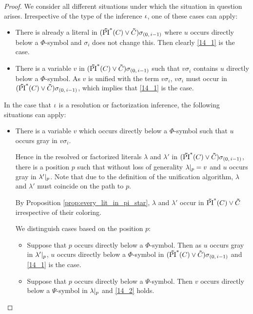 \documentclass[%
	draft=false,%
	numbers=noendperiod,%
	11pt,%
	a4paper,%
	oneside,%
	openany,%
]{memoir}
\begin{document}
\begin{proof}
	We consider all different situations under which the situation in question arises.
	Irrespective of the type of the inference $\iota$, one of these cases can apply:

	\begin{itemize}
		\item
			There is already a literal in $(\bm\tilde{\operatorname{PI}}^{*}(C)\lor \bm\tilde{C})\sigma_{(0,\,i-1)}$ where $u$ occurs directly below a $\Phi$-symbol and $\sigma_i$ does not change this.
			Then clearly \ref{14_1} is the case.

		\item
			There is a variable $v$ in $(\bm\tilde{\operatorname{PI}}^{*}(C)\lor \bm\tilde{C})\sigma_{(0,\,i-1)}$ such that $v\sigma_i$ contains $u$ directly below a $\Phi$-symbol.
			As $v$ is unified with the term $v\sigma_i$, $v\sigma_i$ must occur in $(\bm\tilde{\operatorname{PI}}^{*}(C)\lor \bm\tilde{C})\sigma_{(0,\,i-1)}$, which implies that \ref{14_1} is the case.

	\end{itemize}


	\noindent
	In the case that $\iota$ is a resolution or factorization inference, 
	the following situations can apply:

	\begin{itemize}
		\item
			There is a variable $v$ which occurs directly below a $\Phi$-symbol such that $u$ occurs gray in $v\sigma_i$.

			Hence in the resolved or factorized literals $\lambda$ and $\lambda'$ in $(\bm\tilde{\operatorname{PI}}^{*}(C)\lor \bm\tilde{C})\sigma_{(0,\,i-1)}$, there is a position $p$ such that without loss of generality $\lambda|_{p} = v$ and $u$ occurs gray in $\lambda'|_{p}$. 
			Note that due to the definition of the unification algorithm, $\lambda$ and $\lambda'$ must coincide on the path to $p$.

			By Proposition \ref{prop:every_lit_in_pi_star}, $\lambda$ and $\lambda'$ occur in $\bm\tilde{\operatorname{PI}}^{*}(C)\lor \bm\tilde{C}$ irrespective of their coloring.

			We distinguish cases based on the position $p$:

			\begin{itemize}
				\item Suppose that $p$ occurs directly below a $\Phi$-symbol.
					Then as $u$ occurs gray in  $\lambda'|_{p}$, $u$ occurs directly below a $\Phi$-symbol in $(\bm\tilde{\operatorname{PI}}^{*}(C)\lor \bm\tilde{C})\sigma_{(0,\,i-1)}$ and \ref{14_1} is the case.

				\item Suppose that $p$ occurs directly below a $\Psi$-symbol.
					Then $v$ occurs directly below a $\Psi$-symbol in $\lambda|_{p}$ and  \ref{14_2} holds.


\end{itemize}
\end{itemize}
\end{proof}
\end{document}
